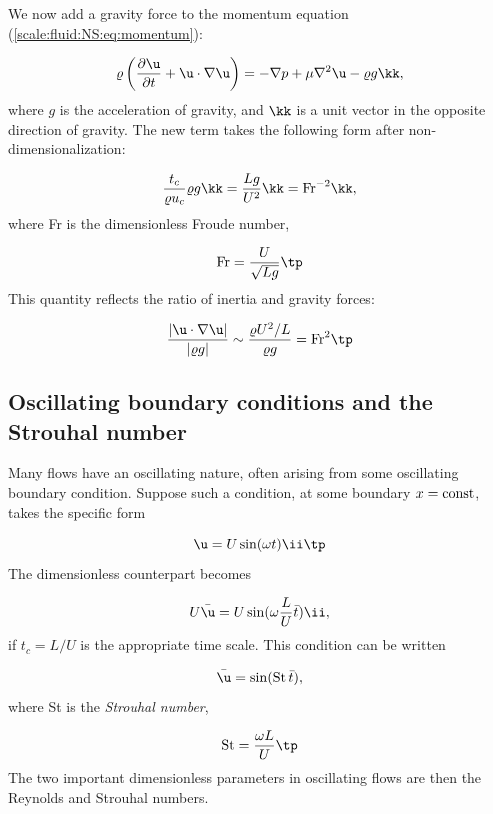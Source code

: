 \documentclass[graybox,envcountchap,sectrefs,final]{svmonodo}
\begin{document}
We now add a gravity force to the momentum equation
(\ref{scale:fluid:NS:eq:momentum}):

\begin{equation}
\varrho\left(\frac{\partial \u}{\partial t} + \u\cdot\nabla\u\right)
= -\nabla p + \mu\nabla^2\u - \varrho g\kk,
\label{scale:fluid:NS:eq:momentum_g}
\end{equation}
where $g$ is the acceleration of gravity, and $\kk$ is a unit
vector in the opposite direction of gravity. The new term
takes the following form after non-dimensionalization:

\[ \frac{t_c}{\varrho  u_c}\varrho g \kk =  \frac{Lg}{U^2}\kk
= \hbox{Fr}^{-2}\kk,\]
where Fr is the dimensionless Froude number,

\[ \hbox{Fr} = \frac{U}{\sqrt{Lg}}\tp\]
This quantity reflects the ratio of inertia and gravity forces:

\[ \frac{|\u\cdot\nabla\u|}{|\varrho g|} \sim \frac{\varrho U^2/L}{\varrho g}
= \hbox{Fr}^2\tp\]


\subsection{Oscillating boundary conditions and the Strouhal number}


Many flows have an oscillating nature, often arising from some
oscillating boundary condition. Suppose such a condition, at some
boundary $x=\hbox{const}$, takes the specific form

\[ \u = U\sin(\omega t)\ii\tp\]
The dimensionless counterpart becomes

\[ U\bar\u = U\sin(\omega \frac{L}{U}\bar t)\ii,\]
if $t_c=L/U$ is the appropriate time scale. This condition can be
written

\begin{equation}
\bar\u = \sin(\hbox{St}\,\bar t),
\end{equation}
where St is the \emph{Strouhal number},

\begin{equation}
\hbox{St} = \frac{\omega L}{U}\tp
\end{equation}
The two important dimensionless parameters in oscillating flows are
then the Reynolds and Strouhal numbers.

\end{document}
